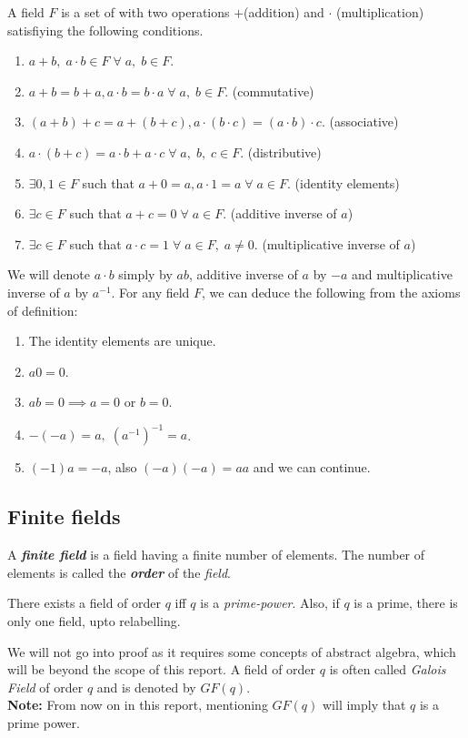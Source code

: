 \documentclass[../main.tex]{subfiles}
\begin{document}
\begin{defn}
	A field $F$ is a set of with two operations $+$(addition) and $\cdot$ (multiplication) satisfiying the following conditions.
	
	\begin{enumerate}[label=(\roman*)]
	\itemsep-1mm
	\item $a+b,\;a\cdot b \in F \;\forall\; a,\;b \in F$.
	\item $a+b=b+a, a\cdot b = b\cdot a \;\forall\; a,\;b \in F$. (commutative)
	\item $(a+b)+c = a+(b+c), a\cdot (b\cdot c) = (a\cdot b)\cdot c.$ (associative)
	\item $a\cdot (b+c) = a\cdot b + a\cdot c \;\forall\; a,\; b,\; c \in F$. (distributive)
	\item $\exists 0, 1 \in F$ such that $a+0 = a, a\cdot 1 = a\;\forall\; a \in F$. (identity elements)
	\item $\exists c \in F$ such that $a+c = 0\;\forall\; a \in F$. (additive inverse of $a$)
	\item $\exists c \in F$ such that $a\cdot c = 1\;\forall\; a \in F,\; a\neq 0$. (multiplicative inverse of $a$)
	\end{enumerate}	 
\end{defn}
We will denote $a\cdot b$ simply by $ab$, additive inverse of $a$ by $-a$ and multiplicative inverse of $a$ by $a^{-1}$.
For any field $F$, we can deduce the following from the axioms of definition:
\begin{enumerate}
	\itemsep-1mm
	\item The identity elements are unique.
	\item $a0 = 0$.
	\item $ab=0 \implies a=0$ or $b=0$.
	\item $-(-a) = a,\; (a^{-1})^{-1} = a$.
	\item $(-1)a = -a$, also $(-a)(-a) = aa$ and we can continue.	
\end{enumerate}
	
\subsection{Finite fields}
	\begin{defn}
	A \textbf{\emph{finite field}} is a field having a finite number of elements. The number of elements is called the \textbf{\emph{order}} of the \emph{field}.
	\end{defn}
	\begin{thm}
	There exists a field of order $q$ iff $q$ is a \emph{prime-power}. Also, if $q$ is a prime, there is only one field, upto relabelling.
	\end{thm}
	We will not go into proof as it requires some concepts of abstract algebra, which will be beyond the scope of this report. A field of order $q$ is often called \emph{Galois Field} of order $q$ and is denoted by $GF(q)$.\\
	\textbf{Note:} From now on in this report, mentioning $GF(q)$ will imply that $q$ is a prime power.
	
\end{document}
